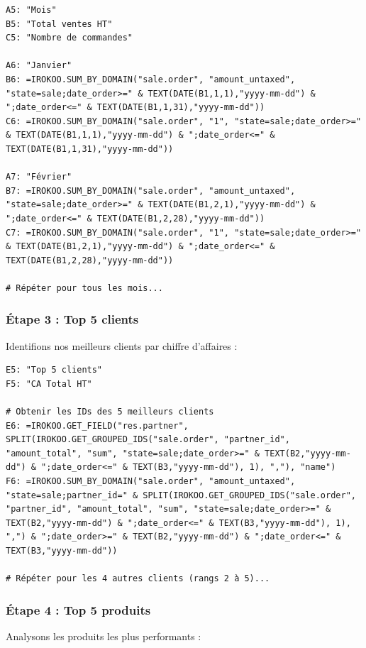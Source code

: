 \documentclass[12pt, a4paper]{article}
\begin{document}
\begin{lstlisting}
A5: "Mois"
B5: "Total ventes HT"
C5: "Nombre de commandes"

A6: "Janvier"
B6: =IROKOO.SUM_BY_DOMAIN("sale.order", "amount_untaxed", "state=sale;date_order>=" & TEXT(DATE(B1,1,1),"yyyy-mm-dd") & ";date_order<=" & TEXT(DATE(B1,1,31),"yyyy-mm-dd"))
C6: =IROKOO.SUM_BY_DOMAIN("sale.order", "1", "state=sale;date_order>=" & TEXT(DATE(B1,1,1),"yyyy-mm-dd") & ";date_order<=" & TEXT(DATE(B1,1,31),"yyyy-mm-dd"))

A7: "Février"
B7: =IROKOO.SUM_BY_DOMAIN("sale.order", "amount_untaxed", "state=sale;date_order>=" & TEXT(DATE(B1,2,1),"yyyy-mm-dd") & ";date_order<=" & TEXT(DATE(B1,2,28),"yyyy-mm-dd"))
C7: =IROKOO.SUM_BY_DOMAIN("sale.order", "1", "state=sale;date_order>=" & TEXT(DATE(B1,2,1),"yyyy-mm-dd") & ";date_order<=" & TEXT(DATE(B1,2,28),"yyyy-mm-dd"))

# Répéter pour tous les mois...
\end{lstlisting}

\subsubsection{Étape 3 : Top 5 clients}

Identifions nos meilleurs clients par chiffre d'affaires :

\begin{lstlisting}
E5: "Top 5 clients"
F5: "CA Total HT"

# Obtenir les IDs des 5 meilleurs clients
E6: =IROKOO.GET_FIELD("res.partner", SPLIT(IROKOO.GET_GROUPED_IDS("sale.order", "partner_id", "amount_total", "sum", "state=sale;date_order>=" & TEXT(B2,"yyyy-mm-dd") & ";date_order<=" & TEXT(B3,"yyyy-mm-dd"), 1), ","), "name")
F6: =IROKOO.SUM_BY_DOMAIN("sale.order", "amount_untaxed", "state=sale;partner_id=" & SPLIT(IROKOO.GET_GROUPED_IDS("sale.order", "partner_id", "amount_total", "sum", "state=sale;date_order>=" & TEXT(B2,"yyyy-mm-dd") & ";date_order<=" & TEXT(B3,"yyyy-mm-dd"), 1), ",") & ";date_order>=" & TEXT(B2,"yyyy-mm-dd") & ";date_order<=" & TEXT(B3,"yyyy-mm-dd"))

# Répéter pour les 4 autres clients (rangs 2 à 5)...
\end{lstlisting}

\subsubsection{Étape 4 : Top 5 produits}

Analysons les produits les plus performants :
\end{document}
